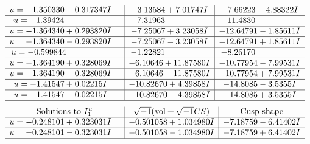 \documentclass[1p]{elsarticle_modified}
\theoremstyle{definition}
\newcommand{\I}{\sqrt{-1}}
\begin{document}
$$\begin{array}{c|c|c}
\begin{aligned}
u &= \phantom{-}1.350330 - 0.317347 I\end{aligned}
 & -3.13584 + 7.01747 I & -7.66223 - 4.88322 I \\ \hline\begin{aligned}
u &= \phantom{-}1.39424\phantom{ +0.000000I}\end{aligned}
 & -7.31963\phantom{ +0.000000I} & -11.4830\phantom{ +0.000000I} \\ \hline\begin{aligned}
u &= -1.364340 + 0.293820 I\end{aligned}
 & -7.25067 + 3.23058 I & -12.64791 - 1.85611 I \\ \hline\begin{aligned}
u &= -1.364340 - 0.293820 I\end{aligned}
 & -7.25067 - 3.23058 I & -12.64791 + 1.85611 I \\ \hline\begin{aligned}
u &= -0.599844\phantom{ +0.000000I}\end{aligned}
 & -1.22821\phantom{ +0.000000I} & -8.26170\phantom{ +0.000000I} \\ \hline\begin{aligned}
u &= -1.364190 + 0.328069 I\end{aligned}
 & -6.10646 + 11.87580 I & -10.77954 - 7.99531 I \\ \hline\begin{aligned}
u &= -1.364190 - 0.328069 I\end{aligned}
 & -6.10646 - 11.87580 I & -10.77954 + 7.99531 I \\ \hline\begin{aligned}
u &= -1.41547 + 0.02215 I\end{aligned}
 & -10.82670 + 4.39858 I & -14.8085 - 3.5355 I \\ \hline\begin{aligned}
u &= -1.41547 - 0.02215 I\end{aligned}
 & -10.82670 - 4.39858 I & -14.8085 + 3.5355 I\\
 \hline 
 \end{array}$$\newpage$$\begin{array}{c|c|c}  
\text{Solutions to }I^u_{1}& \I (\text{vol} + \sqrt{-1}CS) & \text{Cusp shape}\\
 \hline 
\begin{aligned}
u &= -0.248101 + 0.323031 I\end{aligned}
 & -0.501058 + 1.034980 I & -7.18759 - 6.41402 I \\ \hline\begin{aligned}
u &= -0.248101 - 0.323031 I\end{aligned}
 & -0.501058 - 1.034980 I & -7.18759 + 6.41402 I\\
 \hline 
 \end{array}$$\newpage
\end{document}
